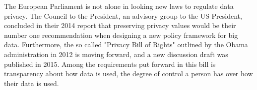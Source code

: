 The European Parliament is not alone in looking new laws to regulate data privacy. The Council to the President, an advisory group to the US President, concluded in their 2014 report \citep{house2014bigdata} that preserving privacy values would be their number one recommendation when designing a new policy framework for big data. Furthermore, the so called "Privacy Bill of Rights" outlined by the Obama administration in 2012 is moving forward, and a new discussion draft was published in 2015\citep{whitehouse2015draft}. Among the requirements put forward in this bill is transparency about how data is used, the degree of control a person has over how their data is used.



\cleardoublepage